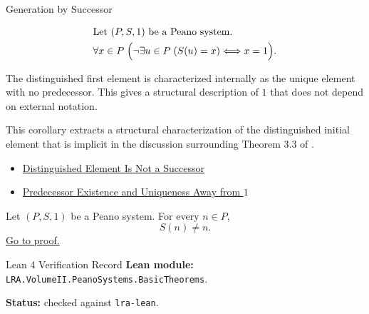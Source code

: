 \begin{topicbox}{Generation by Successor}
\begin{remark*}
\[
\begin{aligned}
&\text{Let } (P,S,1) \text{ be a Peano system.}\\
&\forall x \in P\;\Bigl(\neg\exists u \in P\;(S(u)=x) \Longleftrightarrow x=1\Bigr).
\end{aligned}
\]
\end{remark*}

\begin{remark*}[Interpretation]
The distinguished first element is characterized internally as the unique
element with no predecessor. This gives a structural description of $1$ that
does not depend on external notation.
\end{remark*}

\begin{remark*}
This corollary extracts a structural characterization of the distinguished
initial element that is implicit in the discussion surrounding Theorem 3.3 of
\citet{FefermanNumberSystems1964}.
\end{remark*}

\begin{dependencies}
\begin{itemize}
  \item \hyperref[ax:peano-one-not-successor]{Distinguished Element Is Not a Successor}
  \item \hyperref[cor:predecessor-exists-unique-away-from-one]{Predecessor Existence and Uniqueness Away from $1$}
\end{itemize}
\end{dependencies}

\begin{tcolorbox}[colback=thmbox, colframe=thmborder, arc=2pt,
  left=6pt, right=6pt, top=4pt, bottom=4pt,
  title={\small\textbf{Theorem (No Object Is Its Own Successor)}} ,
  fonttitle=\small\bfseries]
\begin{theorem}
\label{thm:no-object-is-its-own-successor}
Let $(P,S,1)$ be a Peano system. For every $n \in P$,
\[
S(n) \neq n.
\]
\hyperref[prf:no-object-is-its-own-successor]{Go to proof.}
\end{theorem}
\end{tcolorbox}

\begin{formalizationrecord}{Lean 4 Verification Record}
\textbf{Lean module:} \texttt{LRA.VolumeII.PeanoSystems.BasicTheorems}.\par
{}
\textbf{Status:} checked against \texttt{lra-lean}.\par


\end{formalizationrecord}
\end{topicbox}
